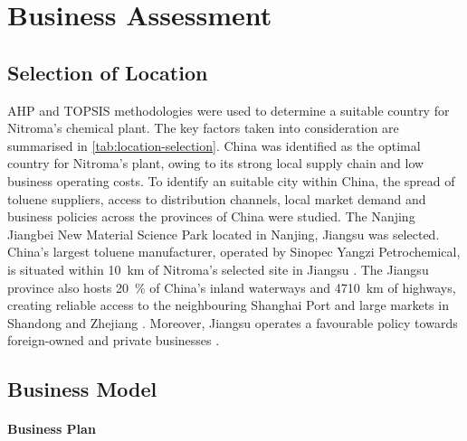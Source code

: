 \section{Business Assessment}
\label{sec:economics}
\subsection{Selection of Location} 
AHP and TOPSIS methodologies were used to determine a suitable country for Nitroma’s chemical plant. The key factors taken into consideration are summarised in \cref{tab:location-selection}. China was identified as the optimal country for Nitroma's plant, owing to its strong local supply chain and low business operating costs. To identify an suitable city within China, the spread of toluene suppliers, access to distribution channels, local market demand and business policies across the provinces of China were studied. The Nanjing Jiangbei New Material Science Park located in Nanjing, Jiangsu was selected. China’s largest toluene manufacturer, operated by Sinopec Yangzi Petrochemical, is situated within \SI{10}{\km} of Nitroma’s selected site in Jiangsu \cite{sinopec_group_sinopec_2014}. The Jiangsu province also hosts \SI{20}{\percent} of China’s inland waterways and \SI{4710}{\km} of highways, creating reliable access to the neighbouring Shanghai Port and large markets in Shandong and Zhejiang \cite{britannica_jiangsu_nodate}. Moreover, Jiangsu operates a favourable policy towards foreign-owned and private businesses \cite{hktdc_sourcing_market_2008}. 


\subsection{Business Model} 
\paragraph{Business Plan}

